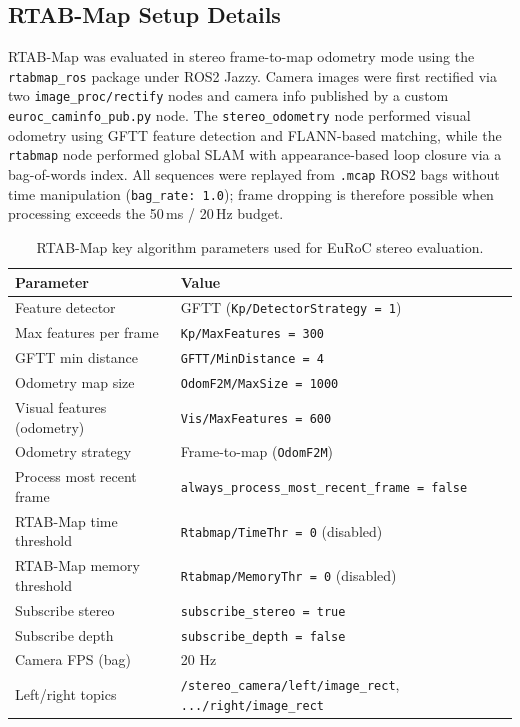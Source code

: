 \documentclass[11pt]{article}
\begin{document}
\subsection{RTAB-Map Setup Details}

RTAB-Map was evaluated in stereo frame-to-map odometry mode using the \texttt{rtabmap\_ros} package under ROS2 Jazzy. Camera images were first rectified via two \texttt{image\_proc/rectify} nodes and camera info published by a custom \texttt{euroc\_caminfo\_pub.py} node. The \texttt{stereo\_odometry} node performed visual odometry using GFTT feature detection and FLANN-based matching, while the \texttt{rtabmap} node performed global SLAM with appearance-based loop closure via a bag-of-words index. All sequences were replayed from \texttt{.mcap} ROS2 bags without time manipulation (\texttt{bag\_rate: 1.0}); frame dropping is therefore possible when processing exceeds the 50\,ms / 20\,Hz budget.

\begin{table}[H]
\centering
\small
\caption{RTAB-Map key algorithm parameters used for EuRoC stereo evaluation.}
\label{tab:rtabmap_algorithm_params}
\begin{tabular}{ll}
\toprule
Parameter & Value \\
\midrule
Feature detector & GFTT (\texttt{Kp/DetectorStrategy = 1}) \\
Max features per frame & \texttt{Kp/MaxFeatures = 300} \\
GFTT min distance & \texttt{GFTT/MinDistance = 4} \\
Odometry map size & \texttt{OdomF2M/MaxSize = 1000} \\
Visual features (odometry) & \texttt{Vis/MaxFeatures = 600} \\
Odometry strategy & Frame-to-map (\texttt{OdomF2M}) \\
Process most recent frame & \texttt{always\_process\_most\_recent\_frame = false} \\
RTAB-Map time threshold & \texttt{Rtabmap/TimeThr = 0} (disabled) \\
RTAB-Map memory threshold & \texttt{Rtabmap/MemoryThr = 0} (disabled) \\
Subscribe stereo & \texttt{subscribe\_stereo = true} \\
Subscribe depth & \texttt{subscribe\_depth = false} \\
Camera FPS (bag) & 20 Hz \\
Left/right topics & \texttt{/stereo\_camera/left/image\_rect}, \texttt{.../right/image\_rect} \\
\bottomrule
\end{tabular}
\end{table}
\end{document}
